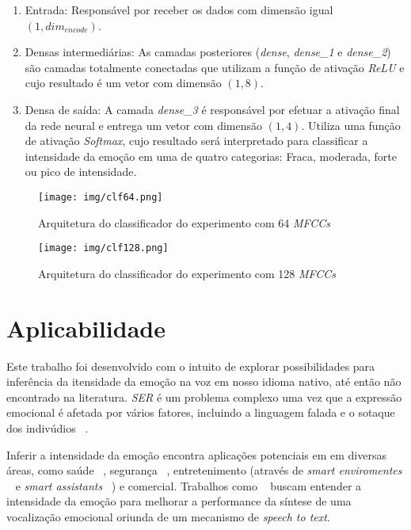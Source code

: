 \begin{enumerate}
    \item Entrada: Responsável por receber os dados com dimensão igual $(1, dim_{encode})$.
    \item Densas intermediárias: As camadas posteriores (\textit{dense}, \textit{dense\_1} e \textit{dense\_2}) são camadas totalmente conectadas que utilizam a função de ativação \textit{ReLU} e cujo resultado é um vetor com dimensão $(1, 8)$.
    \item Densa de saída: A camada \textit{dense\_3} é responsável por efetuar a ativação final da rede neural e entrega um vetor com dimensão $(1, 4)$. Utiliza uma função de ativação \textit{Softmax}, cujo resultado será interpretado para classificar a intensidade da emoção em uma de quatro categorias: Fraca, moderada, forte ou pico de intensidade.
\end{enumerate}

\begin{figure}[]
    \centering
    \begin{minipage}[b]{0.45\linewidth}
        \centering
        \texttt{[image: img/clf64.png]}
        \caption{\label{fig:clf64}Arquitetura do classificador do experimento com 64 \textit{MFCCs}}
    \end{minipage}
    \begin{minipage}[b]{0.45\linewidth}
    \centering
        \texttt{[image: img/clf128.png]}
        \caption{\label{fig:clf128}Arquitetura do classificador do experimento com 128 \textit{MFCCs}}
    \end{minipage}
\end{figure}

\section{Aplicabilidade}\label{sec:aplicabilidade}

Este trabalho foi desenvolvido com o intuito de explorar possibilidades para inferência da itensidade da emoção na voz em nosso idioma nativo, até então não encontrado na literatura. \textit{SER} é um problema complexo uma vez que a expressão emocional é afetada por vários fatores, incluindo a linguagem falada e o sotaque dos indivúdios ~\cite{6}.

Inferir a intensidade da emoção encontra aplicações potenciais em em diversas áreas, como saúde ~\cite{1}, segurança ~\cite{4}, entretenimento (através de \textit{smart enviromentes} ~\cite{alexa1} e \textit{smart assistants} ~\cite{alexa2}) e comercial\cite{bsignal1}\cite{bsignal2}. Trabalhos como ~\cite{63} buscam entender a intensidade da emoção para melhorar a performance da síntese de uma vocalização emocional oriunda de um mecanismo de \textit{speech to text}.

